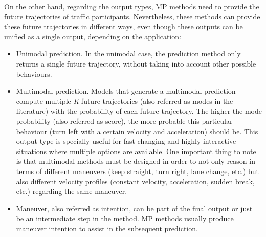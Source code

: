 On the other hand, regarding the output types, \ac{MP} methods need to provide the future trajectories of traffic participants. Nevertheless, these methods can provide these future trajectories in different ways, even though these outputs can be unified as a single output, depending on the application:

\begin{itemize}
	\item Unimodal prediction. In the unimodal case, the prediction method only returns a single future trajectory, without taking into account other possible behaviours. 
	\item Multimodal prediction. Models that generate a multimodal prediction compute multiple \textit{K} future trajectories (also referred as modes in the literature) with the probability of each future trajectory. The higher the mode probability (also referred as score), the more probable this particular behaviour (turn left with a certain velocity and acceleration) should be. This output type is specially useful for fast-changing and highly interactive situations where multiple options are available. One important thing to note is that multimodal methods must be designed in order to not only reason in terms of different maneuvers (keep straight, turn right, lane change, etc.) but also different velocity profiles (constant velocity, acceleration, sudden break, etc.) regarding the same maneuver.
	\item Maneuver, also referred as intention, can be part of the final output or just be an intermediate step in the method. \ac{MP} methods usually produce maneuver intention to assist in the subsequent prediction.
\end{itemize}

